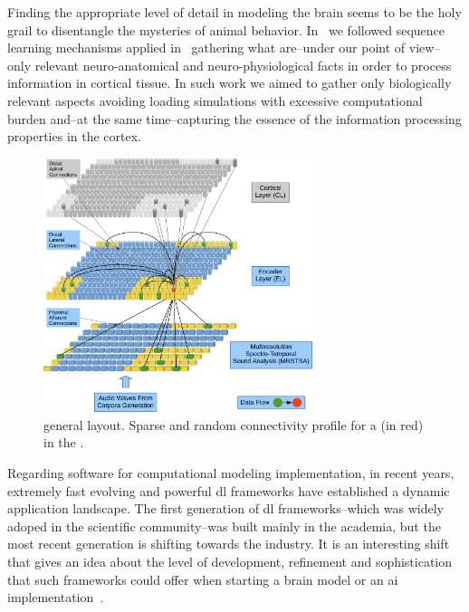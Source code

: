 {Finding the appropriate level of detail in modeling the brain seems to be the holy grail to disentangle the mysteries of animal behavior. In~\cite{10.1371/journal.pone.0217966} we followed sequence learning mechanisms applied in~\cite{10.3389/fncir.2016.00023} gathering what are--under our point of view--only relevant neuro-anatomical and neuro-physiological facts in order to process information in cortical tissue. In such work we aimed to gather only biologically relevant aspects avoiding loading simulations with excessive computational burden and--at the same time--capturing the essence of the information processing properties in the cortex.

\begin{figure}[ht]
    \centering
    \includegraphics[width=0.7\textwidth]{EncoderColumnConnections1.png}
    \caption{ general layout. Sparse and random connectivity profile for a  (in red) in the .}
    \label{fig:EncoderColumnConnections1}
\end{figure}

Regarding software for computational modeling implementation, in recent years, extremely fast evolving and powerful \gls{dl} frameworks have established a dynamic application landscape. The first generation of \gls{dl} frameworks--which was widely adoped in the scientific community--was built mainly in the academia, but the most recent generation is shifting towards the industry. It is an interesting shift  that gives an idea about the level of development, refinement and sophistication that such frameworks could offer when starting a brain model or an \gls{ai} implementation~\cite{Bahrampour2015ComparativeSO,7979887}. 

}
